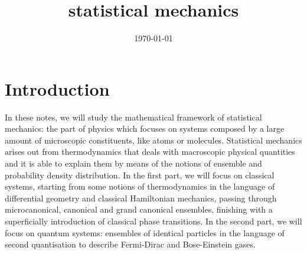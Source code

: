 \documentclass[a4paper, 12pt, openany]{memoir}
\title{statistical mechanics}
\date{\today}
\begin{document}
\frontmatter



\tableofcontents

\mainmatter



\chapter*{Introduction}

    In these notes, we will study the mathematical framework of statistical mechanics: the part of physics which focuses on systems composed by a large amount of microscopic constituents, like atoms or molecules. Statistical mechanics arises out from thermodynamics that deals with macroscopic physical quantities and it is able to explain them by means of the notions of ensemble and probability density distribution. In the first part, we will focus on classical systems, starting from some notions of thermodynamics in the language of differential geometry and classical Hamiltonian mechanics, passing through microcanonical, canonical and grand canonical ensembles, finishing with a superficially introduction of classical phase transitions. In the second part, we will focus on quantum systems: ensembles of identical particles in the language of second quantisation to describe Fermi-Dirac and Bose-Einstein gases.
    











\backmatter

\nocite{smlecture}
\nocite{ercolessi}
\nocite{mussardo}

\clearpage
\listoffigures

\clearpage
\listoftables

\clearpage
\listofequations

\clearpage
{}
\printbibliography
\end{document}
